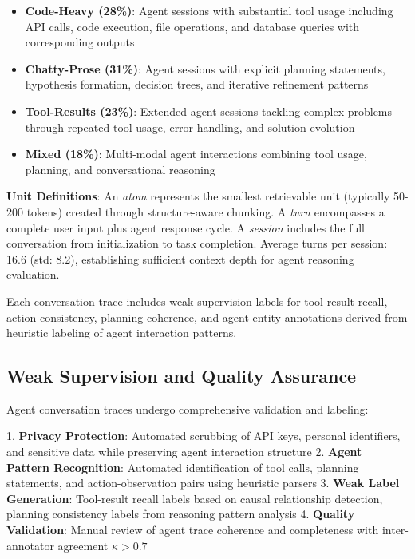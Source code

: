 \documentclass[letterpaper]{article}
\begin{document}
\begin{itemize}
    \item \textbf{Code-Heavy (28\%)}: Agent sessions with substantial tool usage including API calls, code execution, file operations, and database queries with corresponding outputs
    \item \textbf{Chatty-Prose (31\%)}: Agent sessions with explicit planning statements, hypothesis formation, decision trees, and iterative refinement patterns  
    \item \textbf{Tool-Results (23\%)}: Extended agent sessions tackling complex problems through repeated tool usage, error handling, and solution evolution
    \item \textbf{Mixed (18\%)}: Multi-modal agent interactions combining tool usage, planning, and conversational reasoning
\end{itemize}

\textbf{Unit Definitions}: An \textit{atom} represents the smallest retrievable unit (typically 50-200 tokens) created through structure-aware chunking. A \textit{turn} encompasses a complete user input plus agent response cycle. A \textit{session} includes the full conversation from initialization to task completion. Average turns per session: 16.6 (std: 8.2), establishing sufficient context depth for agent reasoning evaluation.

Each conversation trace includes weak supervision labels for tool-result recall, action consistency, planning coherence, and agent entity annotations derived from heuristic labeling of agent interaction patterns.

\subsection{Weak Supervision and Quality Assurance}

Agent conversation traces undergo comprehensive validation and labeling:

1. \textbf{Privacy Protection}: Automated scrubbing of API keys, personal identifiers, and sensitive data while preserving agent interaction structure
2. \textbf{Agent Pattern Recognition}: Automated identification of tool calls, planning statements, and action-observation pairs using heuristic parsers
3. \textbf{Weak Label Generation}: Tool-result recall labels based on causal relationship detection, planning consistency labels from reasoning pattern analysis
4. \textbf{Quality Validation}: Manual review of agent trace coherence and completeness with inter-annotator agreement $\kappa > 0.7$
\end{document}
